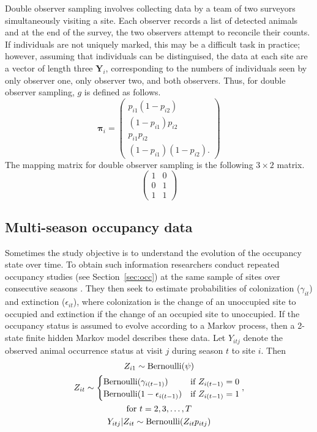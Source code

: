\documentclass[article,shortnames]{jss}
\DeclareMathOperator{\Bern}{Bernoulli}
\begin{document}
Double observer sampling involves collecting data by a team of two surveyors
simultaneously visiting a site.  Each observer records a list of detected 
animals and at the end of the survey, the two observers attempt to reconcile
their counts.  If individuals are not uniquely marked, this may be a difficult 
task in practice; however, assuming that individuals can be distinguised, the 
data at each site are a vector of length three $\mathbf Y_i$,
corresponding to the numbers of individuals seen by only observer one,
only observer two, and both observers.  Thus, for double observer sampling, 
$g$ is
defined as follows.
\begin{equation}
  \mathbf \pi_i =
  \begin{pmatrix}
    p_{i1}(1-p_{i2}) \\
    (1-p_{i1})p_{i2} \\
    p_{i1}p_{i2} \\
    (1-p_{i1})(1-p_{i2}).
  \end{pmatrix}
\end{equation}
The  mapping matrix for double observer sampling is the
following $3 \times 2$ matrix.
\begin{equation}
  \begin{pmatrix}
    1 & 0 \\
    0 & 1 \\
    1 & 1 
  \end{pmatrix}
\end{equation}


\subsection{Multi-season occupancy data}

Sometimes the study objective is to understand the evolution of
the occupancy state over time. To obtain such information researchers conduct 
repeated occupancy studies (see Section~\ref{sec:occ}) at the same sample of 
sites over consecutive seasons \citep{MacKenzie2003}.  They then seek to estimate
probabilities of colonization ($\gamma_{it}$) and extinction
($\epsilon_{it}$), where colonization is the change of an unoccupied
site to occupied and extinction if the change of an occupied site to
unoccupied.  If the occupancy status is assumed to evolve according to
a Markov process, then a 2-state finite hidden Markov model describes
these data.  Let $Y_{itj}$ denote the observed animal occurrence
status at visit $j$ during season $t$ to site $i$.  Then
\begin{gather}
  Z_{i1} \sim \Bern(\psi) \\
  Z_{it} \sim
  \begin{cases}
    \Bern(\gamma_{i(t-1)}) & \text{if $Z_{i(t-1)} = 0$} \\
    \Bern(1-\epsilon_{i(t-1)}) & \text{if $Z_{i(t-1)} = 1$}
  \end{cases}, \\
  \text{for $t=2,3,\dots,T$} \notag \\
  Y_{itj} | Z_{it} \sim \Bern(Z_{it} p_{itj})
\end{gather}
\end{document}
